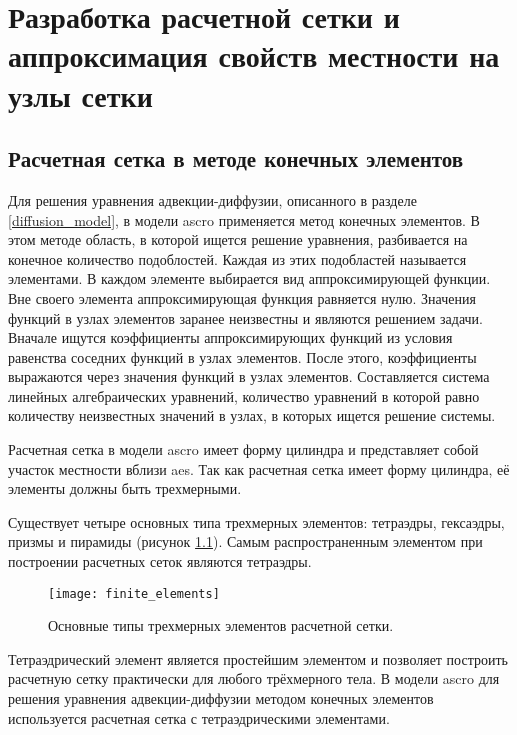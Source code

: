 \chapter{Разработка расчетной сетки и аппроксимация свойств местности на узлы сетки}

\section{Расчетная сетка в методе конечных элементов}
\label{sec_fin_elem_mesh}

Для решения уравнения адвекции-диффузии, описанного в разделе \ref{diffusion_model}, в модели \ac{ascro} применяется 
метод конечных элементов. В этом методе область, в которой ищется решение уравнения, разбивается на конечное количество 
подоблостей. Каждая из этих подобластей называется элементами. В каждом элементе выбирается вид аппроксимирующей функции. 
Вне своего элемента аппроксимирующая функция равняется нулю. Значения функций в узлах элементов заранее неизвестны и 
являются решением задачи. Вначале ищутся коэффициенты аппроксимирующих функций из условия равенства соседних функций в 
узлах элементов. После этого, коэффициенты выражаются через значения функций в узлах элементов. Составляется система 
линейных алгебраических уравнений, количество уравнений в которой равно количеству неизвестных значений в узлах, в 
которых ищется решение системы. 

Расчетная сетка в модели \ac{ascro} имеет форму цилиндра и представляет собой участок местности вблизи \ac{aes}. 
Так как расчетная сетка имеет форму цилиндра, её элементы должны быть трехмерными.

Существует четыре основных типа трехмерных элементов: тетраэдры, гексаэдры, призмы и пирамиды (рисунок 
\ref{fig_finite_elements}). Самым распространенным элементом при построении расчетных сеток являются тетраэдры. 

\begin{figure}[ht]
\centering
	\texttt{[image: finite\_elements]}
	\captionsetup{justification=centering}
    \caption{Основные типы трехмерных элементов расчетной сетки.}
    \label{fig_finite_elements}
\end{figure}

Тетраэдрический элемент является простейшим элементом и позволяет построить расчетную сетку практически для любого 
трёхмерного тела. В модели \ac{ascro} для решения уравнения адвекции-диффузии методом конечных элементов используется 
расчетная сетка с тетраэдрическими элементами.

